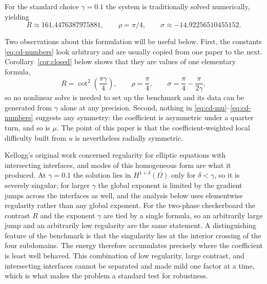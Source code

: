 \documentclass[10pt,pdftex]{amsart}%
\numberwithin{equation}{section}
\begin{document}
For the standard choice $\gamma=0.1$ the system is traditionally solved numerically, yielding
\begin{equation}\label{eq:cd-numbers}
  R\approx161.4476387975881,
  \qquad \rho=\pi/4,
  \qquad \sigma\approx-14.92256510455152 .
\end{equation}

Two observations about this formulation will be useful below.  First, the constants \eqref{eq:cd-numbers} look arbitrary and are usually copied from one paper to the next.  Corollary~\ref{cor:closed} below shows that they are values of one elementary formula,
\begin{equation}\label{eq:closed-intro}
  R=\cot^2\!\left(\frac{\pi\gamma}{4}\right),
  \qquad
  \rho=\frac{\pi}{4},
  \qquad
  \sigma=\frac{\pi}{4}-\frac{\pi}{2\gamma},
\end{equation}
so no nonlinear solve is needed to set up the benchmark and its data can be generated from $\gamma$ alone at any precision. Second, nothing in \eqref{eq:cd-mu}--\eqref{eq:cd-numbers} suggests any symmetry: the coefficient is asymmetric under a quarter turn, and so is $\mu$.  The point of this paper is that the coefficient-weighted local difficulty built from $u$ is nevertheless radially symmetric.

Kellogg's original work \cite{Kellogg} concerned regularity for elliptic equations with intersecting interfaces, and modes of this homogeneous form are what it produced.  At $\gamma=0.1$ the solution lies in $H^{1+\delta}(\Omega)$ only for $\delta<\gamma$, so it is severely singular; for larger $\gamma$ the global exponent is limited by the gradient jumps across the interfaces as well, and the analysis below uses elementwise regularity rather than any global exponent.  For the two-phase checkerboard the contrast $R$ and the exponent $\gamma$ are tied by a single formula, so an arbitrarily large jump and an arbitrarily low regularity are the same statement.  A distinguishing feature of the benchmark is that the singularity lies at the interior crossing of the four subdomains.  The energy therefore accumulates precisely where the coefficient is least well behaved.  This combination of low regularity, large contrast, and intersecting interfaces cannot be separated and made mild one factor at a time, which is what makes the problem a standard test for robustness.
\end{document}
